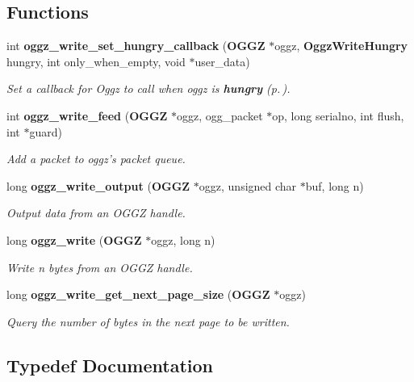 \subsection*{Functions}
\begin{CompactItemize}
\item 
int {\bf oggz\_\-write\_\-set\_\-hungry\_\-callback} ({\bf OGGZ} $\ast$oggz, {\bf Oggz\-Write\-Hungry} hungry, int only\_\-when\_\-empty, void $\ast$user\_\-data)
\begin{CompactList}\small\item\em Set a callback for Oggz to call when {\em oggz\/} is {\bf hungry }{\rm (p.\,\pageref{group__hungry})}. \item\end{CompactList}\item 
int {\bf oggz\_\-write\_\-feed} ({\bf OGGZ} $\ast$oggz, ogg\_\-packet $\ast$op, long serialno, int flush, int $\ast$guard)
\begin{CompactList}\small\item\em Add a packet to {\em oggz's\/} packet queue. \item\end{CompactList}\item 
long {\bf oggz\_\-write\_\-output} ({\bf OGGZ} $\ast$oggz, unsigned char $\ast$buf, long n)
\begin{CompactList}\small\item\em Output data from an OGGZ handle. \item\end{CompactList}\item 
long {\bf oggz\_\-write} ({\bf OGGZ} $\ast$oggz, long n)
\begin{CompactList}\small\item\em Write n bytes from an OGGZ handle. \item\end{CompactList}\item 
long {\bf oggz\_\-write\_\-get\_\-next\_\-page\_\-size} ({\bf OGGZ} $\ast$oggz)
\begin{CompactList}\small\item\em Query the number of bytes in the next page to be written. \item\end{CompactList}\end{CompactItemize}


\subsection{Typedef Documentation}
